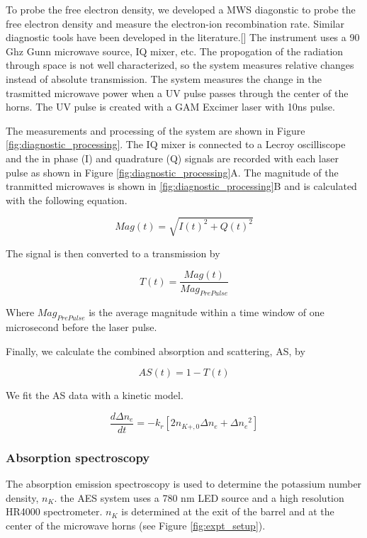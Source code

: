 To probe the free electron density, we developed a MWS diagonstic to probe the free electron density and measure the electron-ion recombination rate. Similar diagnostic tools have been developed in the literature.[] The instrument uses a 90 Ghz Gunn microwave source, IQ mixer, etc. The propogation of the radiation through space is not well characterized, so the system measures relative changes instead of absolute transmission. The system measures the change in the trasmitted microwave power when a UV pulse passes through the center of the horns. The UV pulse is created with a GAM Excimer laser with 10ns pulse. 

The measurements and processing of the system are shown in Figure \ref{fig:diagnostic_processing}. The IQ mixer is connected to a Lecroy oscilliscope and the in phase (I) and quadrature (Q) signals are recorded with each laser pulse as shown in Figure \ref{fig:diagnostic_processing}A. The magnitude of the tranmitted microwaves is shown in \ref{fig:diagnostic_processing}B and is calculated with the following equation.

\begin{equation}
    Mag(t) = \sqrt{I(t)^2 + Q(t)^2}
\end{equation}

The signal is then converted to a transmission by 

\begin{equation}
    T(t) = \frac{Mag(t)}{Mag_{Pre Pulse}}
\end{equation}

Where $Mag_{Pre Pulse}$ is the average magnitude within a time window of one microsecond before the laser pulse. 

Finally, we calculate the combined absorption and scattering, AS, by

\begin{equation}
    AS(t) = 1 - T(t)
\end{equation}

We fit the AS data with a kinetic model. 

\begin{equation}
    \frac{d\Delta n_e}{dt} = - k_r [2 n_{K+,0}\Delta n_e + \Delta{n_e}^2]
\end{equation}

\subsubsection{Absorption spectroscopy}

The absorption emission spectroscopy is used to determine the potassium number density, $n_K$. the AES system uses a 780 nm LED source and a high resolution HR4000 spectrometer. $n_K$ is determined at the exit of the barrel and at the center of the microwave horns (see Figure \ref{fig:expt_setup}).

